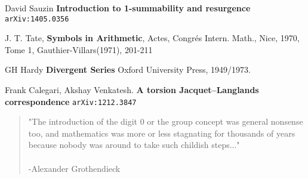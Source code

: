 \documentclass[12pt]{article}
\begin{document}
\vfill



\begin{thebibliography}{}

\item David Sauzin \textbf{Introduction to 1-summability and resurgence} \texttt{arXiv:1405.0356}

\item J. T. Tate, \textbf{Symbols in Arithmetic}, Actes, Congr\'{e}s Intern. Math., Nice, 1970, Tome 1, Gauthier-Villars(1971), 201-211

\item GH Hardy \textbf{Divergent Series}  Oxford University Press, 1949/1973.

\item Frank Calegari, Akshay Venkatesh.  \textbf{A torsion Jacquet--Langlands correspondence} \texttt{arXiv:1212.3847}

\end{thebibliography}
\vspace{0.5in}

\begin{quotation}
\noindent "The introduction of the digit 0 or the group concept was general nonsense too, and mathematics was more or less stagnating for thousands of years because nobody was around to take such childish steps..." \\ \\
-Alexander Grothendieck
\end{quotation}

\newpage
\end{document}
